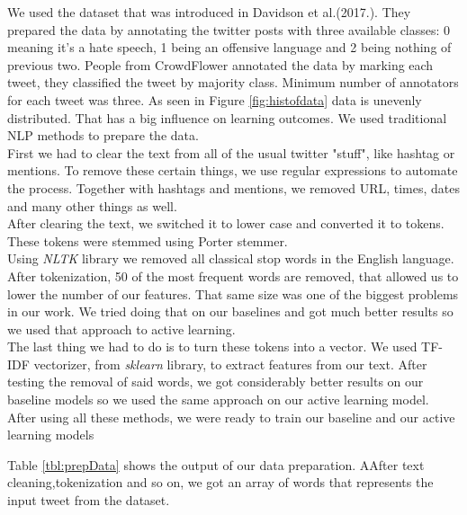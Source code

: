 \documentclass[10pt, a4paper]{article}
\begin{document}
We used the dataset that was introduced in Davidson et al.(2017.). They prepared the data by annotating the twitter posts with three available classes: 0 meaning it's a hate speech, 1 being an offensive language and 2 being nothing of previous two. People from CrowdFlower annotated the data by marking each tweet, they classified the tweet by majority class. Minimum number of annotators for each tweet was three.
As seen in Figure \ref{fig:histofdata} data is unevenly distributed. That has a big influence on learning outcomes. We used traditional NLP methods to prepare the data.
\\First we had to clear the text from all of the usual twitter "stuff", like hashtag or mentions. To remove these certain things, we use regular expressions to automate the process. Together with hashtags and mentions, we removed URL, times, dates and many other things as well.
\\After clearing the text, we switched it to lower case and converted it to tokens. These tokens were stemmed using Porter stemmer.
\\Using \textit{NLTK} library we removed all classical stop words in the English language. After tokenization, 50 of the most frequent words are removed, that allowed us to lower the number of our features. That same size was one of the biggest problems in our work.
We tried doing that on our baselines and got much better results so we used that approach to active learning.
\\The last thing we had to do is to turn these tokens into a vector. We used TF-IDF vectorizer, from \textit{sklearn} library, to extract features from our text. After testing the removal of said words, we got considerably better results on our baseline models so we used the same approach on our active learning model.
After using all these methods, we were ready to train our baseline and our active learning models

Table \ref{tbl:prepData} shows the output of our data preparation. AAfter text cleaning,tokenization and so on, we got an array of words that represents the input tweet from the dataset.
\end{document}
